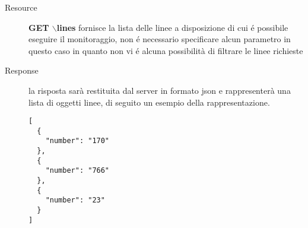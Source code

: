 \begin{description}
	\item[Resource] \textbf{GET $\backslash$lines} fornisce la lista delle linee a disposizione di cui é possibile eseguire il monitoraggio, non é necessario specificare alcun parametro in questo caso in quanto non vi é alcuna possibilità di filtrare le linee richieste
	\item[Response] la risposta sarà restituita dal server in formato json e rappresenterà una lista di oggetti linee, di seguito un esempio della rappresentazione.

	\begin{verbatim}
[
  {
    "number": "170"
  },
  {
    "number": "766"
  },
  {
    "number": "23"
  }
]
	\end{verbatim}
\end{description}